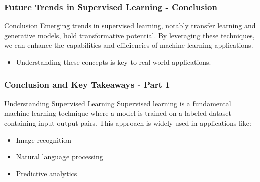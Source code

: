 \documentclass[aspectratio=169]{beamer}
\begin{document}
\begin{frame}[fragile]
    \frametitle{Future Trends in Supervised Learning - Conclusion}
    \begin{block}{Conclusion}
        Emerging trends in supervised learning, notably transfer learning and generative models, hold transformative potential. By leveraging these techniques, we can enhance the capabilities and efficiencies of machine learning applications.
    \end{block}
    
    \begin{itemize}
        \item Understanding these concepts is key to real-world applications.
    \end{itemize}
\end{frame}

\begin{frame}[fragile]
    \frametitle{Conclusion and Key Takeaways - Part 1}

    \begin{block}{Understanding Supervised Learning}
        Supervised learning is a fundamental machine learning technique where a model is trained on a labeled dataset containing input-output pairs. This approach is widely used in applications like:
        \begin{itemize}
            \item Image recognition
            \item Natural language processing
            \item Predictive analytics
        \end{itemize}
    \end{block}
\end{frame}
\end{document}
